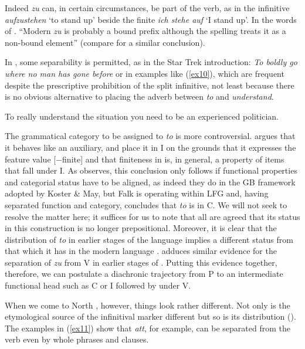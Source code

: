 \documentclass[output=paper]{langsci/langscibook}
\begin{document}
Indeed \emph{zu} can, in certain circumstances, be part of the verb, as in the
infinitive \emph{aufzustehen} `to stand up' beside the finite \emph{ich stehe
    auf} `I stand up'. In the words of \cite[296]{Haspelmath89}. \enquote{Modern
     \emph{zu} is probably a bound prefix although the spelling
    treats it as a non-bound element} (compare \citealt{Giusti91} for a similar
    conclusion).

In , some separability is permitted, as in the Star Trek
introduction: \emph{To boldly go where no man has gone before} or in examples
like (\ref{ex10}), which are frequent despite the prescriptive prohibition of
the split infinitive, not least because there is no obvious alternative to
placing the adverb between \emph{to} and \emph{understand}.

\begin{exe}
\ex\label{ex10}
To really understand the situation you need to be an experienced politician.
\end{exe}

The grammatical category to be assigned to  \emph{to} is more
controversial. \cite{Pullum82} argues that it behaves like an auxiliary, and
\cite{KostMay82} place it in I on the grounds that it expresses the feature
value [$-$finite] and that finiteness in  is, in general, a
property of items that fall under I.  As \cite{Falk01to} observes, this
conclusion only follows if functional properties and categorial status have to
be aligned, as indeed they do in the GB framework adopted by Koster \& May, but
Falk is operating within \gls{LFG} and, having
separated function and category, concludes that \emph{to} is in C. We will not
seek to resolve the matter here; it suffices for us to note that all are agreed
that its status in this construction is no longer prepositional. Moreover, it
is clear that the distribution of \emph{to} in earlier stages of the language
implies a different status from that which it has in the modern language
\citep{vanGelderen98}.  \cite{Haspelmath89} adduces similar evidence for the
separation of \emph{zu} from V in earlier stages of . Putting this
evidence together, therefore, we can postulate a diachronic trajectory from P
to an intermediate functional head such as C or I followed by
 under V.

When we come to North , however, things look rather different.
Not only is the etymological source of the infinitival marker different but so
is its distribution (\citealt{Platzack86, BeukDikk89, Christensen07}). The
examples in (\ref{ex11}) show that  \emph{att}, for example, can
be separated from the verb even by whole phrases and clauses.
\end{document}
